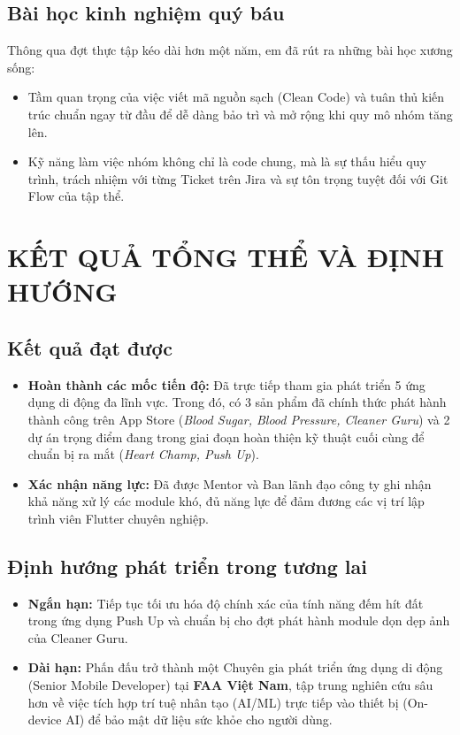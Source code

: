 \documentclass[12pt, a4paper]{article}
\begin{document}
\subsection{Bài học kinh nghiệm quý báu}
Thông qua đợt thực tập kéo dài hơn một năm, em đã rút ra những bài học xương sống:
\begin{itemize}
    \item Tầm quan trọng của việc viết mã nguồn sạch (Clean Code) và tuân thủ kiến trúc chuẩn ngay từ đầu để dễ dàng bảo trì và mở rộng khi quy mô nhóm tăng lên.
    \item Kỹ năng làm việc nhóm không chỉ là code chung, mà là sự thấu hiểu quy trình, trách nhiệm với từng Ticket trên Jira và sự tôn trọng tuyệt đối với Git Flow của tập thể.
\end{itemize}

\section{KẾT QUẢ TỔNG THỂ VÀ ĐỊNH HƯỚNG}

\subsection{Kết quả đạt được}
\begin{itemize}
    \item \textbf{Hoàn thành các mốc tiến độ:} Đã trực tiếp tham gia phát triển 5 ứng dụng di động đa lĩnh vực. Trong đó, có 3 sản phẩm đã chính thức phát hành thành công trên App Store (\textit{Blood Sugar, Blood Pressure, Cleaner Guru}) và 2 dự án trọng điểm đang trong giai đoạn hoàn thiện kỹ thuật cuối cùng để chuẩn bị ra mắt (\textit{Heart Champ, Push Up}).
    \item \textbf{Xác nhận năng lực:} Đã được Mentor và Ban lãnh đạo công ty ghi nhận khả năng xử lý các module khó, đủ năng lực để đảm đương các vị trí lập trình viên Flutter chuyên nghiệp.
\end{itemize}

\subsection{Định hướng phát triển trong tương lai}
\begin{itemize}
    \item \textbf{Ngắn hạn:} Tiếp tục tối ưu hóa độ chính xác của tính năng đếm hít đất trong ứng dụng Push Up và chuẩn bị cho đợt phát hành module dọn dẹp ảnh của Cleaner Guru.
    \item \textbf{Dài hạn:} Phấn đấu trở thành một Chuyên gia phát triển ứng dụng di động (Senior Mobile Developer) tại \textbf{FAA Việt Nam}, tập trung nghiên cứu sâu hơn về việc tích hợp trí tuệ nhân tạo (AI/ML) trực tiếp vào thiết bị (On-device AI) để bảo mật dữ liệu sức khỏe cho người dùng.
\end{itemize}
\end{document}
